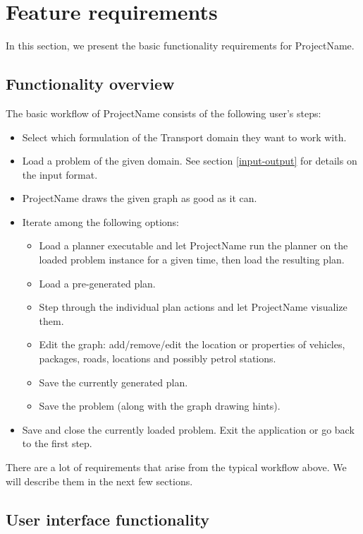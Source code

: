 \documentclass[10pt,a4paper,oneside]{article}
\newcommand{\pname}{ProjectName} %
\begin{document}
\section{Feature requirements}

In this section, we present the basic functionality requirements for \pname{}.

\subsection{Functionality overview}

The basic workflow of \pname{} consists of the following user's steps:
\begin{itemize}
\item Select which formulation of the Transport domain they want to work with.
\item Load a problem of the given domain. See section \ref{input-output} for details on the input format.
\item \pname{} draws the given graph as good as it can.
\item Iterate among the following options:
\begin{itemize}
\item Load a planner executable and let \pname{} run the planner on the loaded problem instance for a given time, then load the resulting plan.
\item Load a pre-generated plan.
\item Step through the individual plan actions and let \pname{} visualize them.
\item Edit the graph: add/remove/edit the location or properties of vehicles, packages, roads, locations and possibly petrol stations.
\item Save the currently generated plan.
\item Save the problem (along with the graph drawing hints).
\end{itemize}
\item Save and close the currently loaded problem. Exit the application or go back to the first step.
\end{itemize}

There are a lot of requirements that arise from the typical workflow above. We will describe them in the next few sections.

\subsection{User interface functionality} \label{ui}
\end{document}
